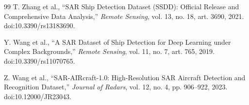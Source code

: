 \documentclass[journal]{IEEEtran}
\begin{document}
\begin{thebibliography}{99}
T. Zhang et al., ``SAR Ship Detection Dataset (SSDD): Official Release and Comprehensive Data Analysis,'' \emph{Remote Sensing}, vol. 13, no. 18, art. 3690, 2021. doi:10.3390/rs13183690.

Y. Wang et al., ``A SAR Dataset of Ship Detection for Deep Learning under Complex Backgrounds,'' \emph{Remote Sensing}, vol. 11, no. 7, art. 765, 2019. doi:10.3390/rs11070765.

Z. Wang et al., ``SAR-AIRcraft-1.0: High-Resolution SAR Aircraft Detection and Recognition Dataset,'' \emph{Journal of Radars}, vol. 12, no. 4, pp. 906--922, 2023. doi:10.12000/JR23043.
\end{thebibliography}
\end{document}
